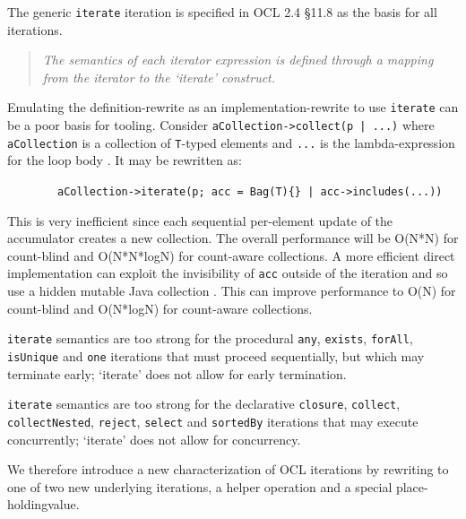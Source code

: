 \documentclass[
]{ceurart}
\begin{document}
The generic \verb!iterate! iteration is specified in OCL 2.4 \S11.8 as the basis for all iterations. 

\begin{quote}\textit{
The semantics of each iterator expression is defined through a mapping from the iterator to the ‘iterate’ construct. %
}\end{quote}

Emulating the definition-rewrite as an implementation-rewrite to use \verb!iterate! can be a poor basis for tooling. Consider \verb!aCollection->collect(p | ...)! where \verb!aCollection! is a collection of \verb!T!-typed elements and \verb!...! is the lambda-expression for the loop body . It may be rewritten as:

\begin{description}[itemsep=-0.2cm]\vspace{-10pt}\small
\item ~~~~~~~~\verb!aCollection->iterate(p; acc = Bag(T){} | acc->includes(...))!
\vspace{-10pt}\end{description}

This is very inefficient since each sequential per-element update of the accumulator creates a new collection. The overall performance will be O(N*N) for count-blind and O(N*N*logN) for count-aware collections. A more efficient direct implementation can exploit the invisibility of \verb!acc! outside of the iteration and so use a hidden mutable Java collection \cite{willink2017deterministic}. This can improve performance to O(N) for count-blind and O(N*logN) for count-aware collections. %

\verb!iterate! semantics are too strong for the procedural \verb!any!, \verb!exists!, \verb!forAll!, \verb!isUnique! and \verb!one! iterations that must proceed sequentially, but which may terminate early; `iterate' does not allow for early termination.

\verb!iterate! semantics are too strong for the declarative \verb!closure!, \verb!collect!, \verb!collectNested!, \verb!reject!, \verb!select! and \verb!sortedBy!  iterations that may execute concurrently; `iterate' does not allow for concurrency.

We therefore introduce a new characterization of OCL iterations by rewriting to one of two new underlying iterations, a helper operation and a special place-holdingvalue.
\end{document}
